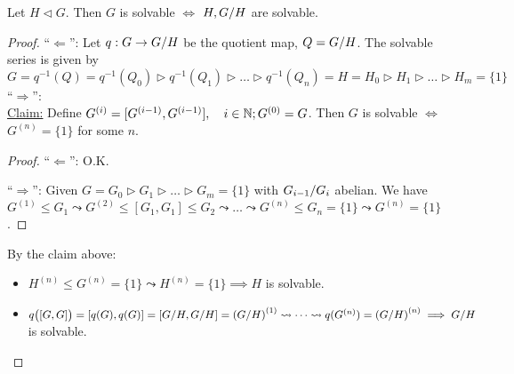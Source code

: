 \begin{prop} \label{prop:quot-solvable}
  Let $H \lhd G$. Then $G$ is solvable $\iff$ $H, {G}/{H}$ are solvable.

  \begin{proof}
    ``$\Leftarrow$'': Let $q: G \to {G}/{H}$ be the quotient map,
    $Q = {G}/{H}$. The solvable series is given by
    \[
      G = q^{-1}(Q) = q^{-1}(Q_0) \rhd q^{-1}(Q_1) \rhd \dots \rhd q^{-1}(Q_n)
      = H = H_0 \rhd H_1 \rhd \dots \rhd H_m = \{ 1 \}
    \]
    ``$\Rightarrow$'': \\
    \underline{Claim:} Define $G^{(i)} = [G^{(i-1)}, G^{(i-1)}], \quad
    i \in \mathbb{N}; G^{(0)} = G$.
    Then $G$ is solvable $\iff$ $G^{(n)} = \{1 \}$ for some $n$.
    \begin{proof}
      ``$\Leftarrow$'': O.K.

      ``$\Rightarrow$'': Given $G = G_0 \rhd G_1 \rhd \dots \rhd G_m = \{1\}$
      with ${G_{i-1}}/{G_i}$ abelian.
      We have $G^{(1)} \le G_1 \leadsto G^{(2)} \le [G_1, G_1] \le G_2 \leadsto
      \dots \leadsto G^{(n)} \le G_n = \{ 1 \} \leadsto G^{(n)} = \{1\}$.
    \end{proof}
    By the claim above:
    \begin{itemize}
      \item $H^{(n)} \le G^{(n)} = \{1\} \leadsto H^{(n)} = \{1\} \implies H$ 
        is solvable.
      \item $q\big([G, G]\big) = [q(G), q(G)] = [{G}/{H}, {G}/{H}] =
        \left({G}/{H}\right)^{(1)} \leadsto \dots \leadsto
        q(G^{(n)}) = \left({G}/{H}\right)^{(n)} \implies {G}/{H}$
        is solvable.
    \end{itemize}
  \end{proof}
\end{prop}

